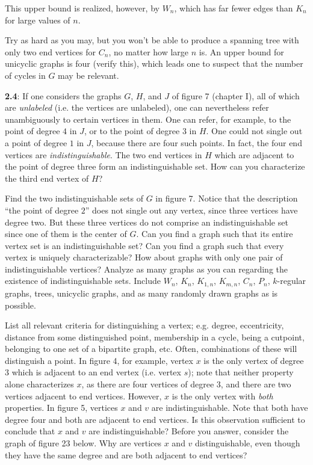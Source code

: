 \documentclass{article}
\begin{document}
This upper bound is realized, however, by $W_n$, which has far fewer edges than $K_n$ for large values of $n$.

Try as hard as you may, but you won't be able to produce a spanning tree with only two end vertices for $C_n$, no matter how large $n$ is. An upper bound for unicyclic graphs is four (verify this), which leads one to suspect that the number of cycles in $G$ may be relevant.

\vspace{0.5cm}

\textbf{2.4}: If one considers the graphs $G$, $H$, and $J$ of figure 7 (chapter I), all of which are \emph{unlabeled} (i.e. the vertices are unlabeled), one can nevertheless refer unambiguously to certain vertices in them. One can refer, for example, to the point of degree $4$ in $J$, or to the point of degree $3$ in $H$. One could not single out a point of degree $1$ in $J$, because there are four such points. In fact, the four end vertices are \emph{indistinguishable}. The two end vertices in $H$ which are adjacent to the point of degree three form an indistinguishable set. How can you characterize the third end vertex of $H$?

Find the two indistinguishable sets of $G$ in figure 7. Notice that the description ``the point of degree $2$'' does not single out any vertex, since three vertices have degree two. But these three vertices do not comprise an indistinguishable set since one of them is the center of $G$. Can you find a graph such that its entire vertex set is an indistinguishable set? Can you find a graph such that every vertex is uniquely characterizable? How about graphs with only one pair of indistinguishable vertices? Analyze as many graphs as you can regarding the existence of indistinguishable sets. Include $W_n$, $K_n$, $K_{1,n}$, $K_{m,n}$, $C_n$, $P_n$, $k$-regular graphs, trees, unicyclic graphs, and as many randomly drawn graphs as is possible.

List all relevant criteria for distinguishing a vertex; e.g. degree, eccentricity, distance from some distinguished point, membership in a cycle, being a cutpoint, belonging to one set of a bipartite graph, etc. Often, combinations of these will distinguish a point. In figure 4, for example, vertex $x$ is the only vertex of degree $3$ which is adjacent to an end vertex (i.e. vertex $s$); note that neither property alone characterizes $x$, as there are four vertices of degree $3$, and there are two vertices adjacent to end vertices. However, $x$ is the only vertex with \emph{both} properties. In figure 5, vertices $x$ and $v$ are indistinguishable. Note that both have degree four and both are adjacent to end vertices. Is this observation sufficient to conclude that $x$ and $v$ are indistinguishable? Before you answer, consider the graph of figure 23 below. Why are vertices $x$ and $v$ distinguishable, even though they have the same degree and are both adjacent to end vertices?
\end{document}
